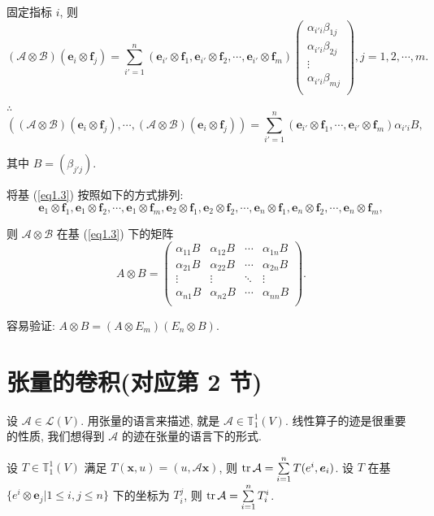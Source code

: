 \documentclass[color=black,device=normal,lang=cn,mode=geye]{elegantnote}
\begin{document}
固定指标 $i$, 则
\[(\mathcal{A}\otimes\mathcal{B})(\boldsymbol{e}_i\otimes\boldsymbol{f}_j)=\sum\limits_{i'=1}^n(\boldsymbol{e}_{i'}\otimes\boldsymbol{f}_1,\boldsymbol{e}_{i'}\otimes\boldsymbol{f}_2,\cdots,\boldsymbol{e}_{i'}\otimes\boldsymbol{f}_m)\begin{pmatrix}
    \alpha_{i'i}\beta_{1j} \\
    \alpha_{i'i}\beta_{2j} \\
    \vdots \\
    \alpha_{i'i}\beta_{mj} \\
\end{pmatrix}, j=1,2,\cdots,m.\]

$\therefore$
\[((\mathcal{A}\otimes\mathcal{B})(\boldsymbol{e}_i\otimes\boldsymbol{f}_j),\cdots,(\mathcal{A}\otimes\mathcal{B})(\boldsymbol{e}_i\otimes\boldsymbol{f}_j))=\sum\limits_{i'=1}^n(\boldsymbol{e}_{i'}\otimes\boldsymbol{f}_1,\cdots,\boldsymbol{e}_{i'}\otimes\boldsymbol{f}_m)\alpha_{i'i}B,\]

其中 $B=(\beta_{j'j})$.

将基 (\ref{eq1.3}) 按照如下的方式排列:
\[\boldsymbol{e}_1\otimes\boldsymbol{f}_1,\boldsymbol{e}_1\otimes\boldsymbol{f}_2,\cdots,\boldsymbol{e}_1\otimes\boldsymbol{f}_m,\boldsymbol{e}_2\otimes\boldsymbol{f}_1,\boldsymbol{e}_2\otimes\boldsymbol{f}_2,\cdots,\boldsymbol{e}_n\otimes\boldsymbol{f}_1,\boldsymbol{e}_n\otimes\boldsymbol{f}_2,\cdots,\boldsymbol{e}_n\otimes\boldsymbol{f}_m,\]

则
$\mathcal{A}\otimes\mathcal{B}$ 在基 (\ref{eq1.3}) 下的矩阵
\[A\otimes B=\begin{pmatrix}
    \alpha_{11}B & \alpha_{12}B & \cdots & \alpha_{1n}B \\
    \alpha_{21}B & \alpha_{22}B & \cdots & \alpha_{2n}B \\
    \vdots & \vdots & \ddots & \vdots \\
    \alpha_{n1}B & \alpha_{n2}B & \cdots & \alpha_{nn}B \\
\end{pmatrix}.\]

容易验证: $A\otimes B=(A\otimes E_m)(E_n\otimes B)$.
\section{张量的卷积(对应第 2 节)}
设 $\mathcal{A}\in\mathcal{L}(V)$. 用张量的语言来描述, 就是 $\mathcal{A}\in\mathbb{T}_1^1(V)$. 线性算子的迹是很重要的性质, 我们想得到 $\mathcal{A}$ 的迹在张量的语言下的形式.

设 $T\in\mathbb{T}_1^1(V)$ 满足 $T(\boldsymbol{x},u)=(u,\mathcal{A}\boldsymbol{x})$, 则 $\operatorname{tr} \mathcal{A}=\sum\limits_{i=1}^nT(e^i,\boldsymbol{e}_i)$. 设 $T$ 在基 $\{e^i\otimes\boldsymbol{e}_j|1\leq i,j\leq n\}$ 下的坐标为 $T_i^j$, 则 $\operatorname{tr} \mathcal{A}=\sum\limits_{i=1}^nT_i^i$.
\end{document}
